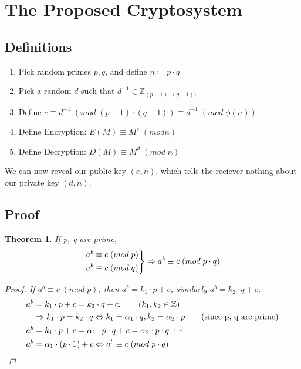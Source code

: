 \documentclass{article}
\newtheorem{theorem}{Theorem}
\begin{document}
\newpage
\section{The Proposed Cryptosystem}
\subsection{Definitions}
\begin{enumerate}
    \item Pick random primes $p, q$, and define $n \coloneqq p \cdot q$
    \item Pick a random $d$ such that $d^{-1} \in \mathbb{Z}_{(p-1) \cdot (q-1))}$
    \item Define $e \equiv d^{-1}\; (mod \; (p-1) \cdot (q-1)) \equiv d^{-1} \; (mod \; \phi(n))$
    \item Define Encryption: $E(M) \equiv M^e\; (mod n)$
    \item Define Decryption: $D(M) \equiv M^d \; (mod \; n)$
\end{enumerate}
We can now reveal our public key $(e, n)$, which tells the reciever nothing about our private key $(d, n)$.

\subsection{Proof}
\begin{theorem}
    If p, q are prime,
    \[
        \begin{rcases*}
            a^b \equiv c \; (mod \; p) \\
            a^b \equiv c \; (mod \; q)
        \end{rcases*}
        \Rightarrow
        a^b \equiv c \; (mod \; p\cdot q)
    \]

    \begin{proof}
        If $a^b \equiv c \; (mod \; p)$, then $a^b = k_1 \cdot p + c$, similarly $a^b = k_2 \cdot q + c$.
        \begin{align*}
            a^b & = k_1\cdot p + c = k_2 \cdot q + c, \tag{$k_1, k_2 \in \mathbb{Z}$}                                                             \\
                & \Rightarrow k_1 \cdot p = k_2 \cdot q \Leftrightarrow k_1 = \alpha_1 \cdot q, k_2 = \alpha_2 \cdot p \tag{since p, q are prime} \\
            a^b & = k_1 \cdot p + c = \alpha_1 \cdot p \cdot q + c = \alpha_2 \cdot p \cdot q + c                                                 \\
            a^b & = \alpha_1 \cdot (p \cdot 1) + c \Leftrightarrow a^b \equiv c \; (mod \; p\cdot q)
        \end{align*}
    \end{proof}
\end{theorem}
\end{document}
